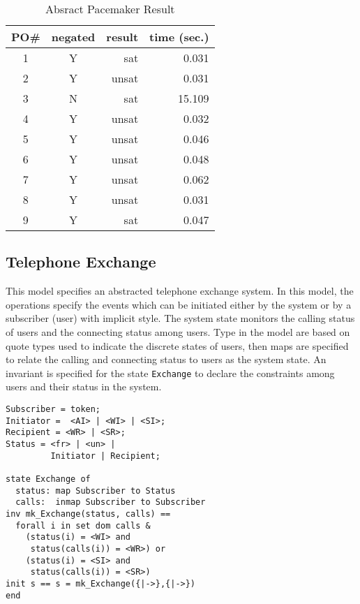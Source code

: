 \begin{table}[htb]
\begin{center}
\begin{tabular}{|c|c|r|r|}
\hline
PO\#	&	negated	&	result	&	time (sec.) \\ \hline
1		&	Y		&	sat		&	0.031 \\ \hline
2		&	Y		&	unsat	&	0.031 \\ \hline
3		&	N		&	sat		&	15.109 \\ \hline
4		&	Y		&	unsat	&	0.032 \\ \hline
5		&	Y		&	unsat	&	0.046 \\ \hline
6		&	Y		&	unsat	&	0.048 \\ \hline
7		&	Y		&	unsat	&	0.062 \\ \hline
8		&	Y		&	unsat	&	0.031 \\ \hline
9		&	Y		&	sat		&	0.047 \\ \hline
\end{tabular}
\end{center}
\caption{Absract Pacemaker Result}
\label{tbl:result1}
\end{table}


\subsection{Telephone Exchange}

This model specifies an abstracted telephone exchange system. In this model, the operations specify the events which can be initiated either by the system or by a subscriber (user) with implicit style. The system state monitors the calling status of users and the connecting status among users. Type in the model are based on quote types used to indicate the discrete states of users, then maps are specified to relate the calling and connecting status to users as the system state. An invariant is specified for the state {\tt Exchange} to declare the constraints among users and their status in the system.

\begin{mdframed}[roundcorner=5pt]
\begin{Verbatim}[fontsize=\small]
Subscriber = token;
Initiator =  <AI> | <WI> | <SI>;
Recipient = <WR> | <SR>;
Status = <fr> | <un> |
         Initiator | Recipient;
                                                                      
state Exchange of
  status: map Subscriber to Status
  calls:  inmap Subscriber to Subscriber
inv mk_Exchange(status, calls) == 
  forall i in set dom calls & 
    (status(i) = <WI> and
     status(calls(i)) = <WR>) or
    (status(i) = <SI> and
     status(calls(i)) = <SR>)
init s == s = mk_Exchange({|->},{|->})
end
\end{Verbatim}
\end{mdframed}

